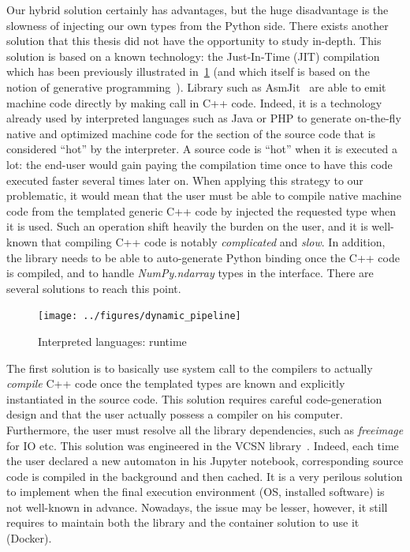 Our hybrid solution certainly has advantages, but the huge disadvantage is the slowness of injecting our own types from
the Python side. There exists another solution that this thesis did not have the opportunity to study in-depth. This
solution is based on a known technology: the Just-In-Time (JIT) compilation which has been previously illustrated
in~\cref{summary:fig:static.dynamic.dynamic.pipeline} (and which itself is based on the notion of generative
programming~\parencite{czarnecki.2000.generative}). Library such as AsmJit~\parencite{kobalicek.2011.asmjit} are able to
emit machine code directly by making call in C++ code. Indeed, it is a technology already used by interpreted languages
such as Java or PHP to generate on-the-fly native and optimized machine code for the section of the source code that is
considered ``hot'' by the interpreter. A source code is ``hot'' when it is executed a lot: the end-user would gain
paying the compilation time once to have this code executed faster several times later on. When applying this strategy
to our problematic, it would mean that the user must be able to compile native machine code from the templated generic
C++ code by injected the requested type when it is used. Such an operation shift heavily the burden on the user, and it
is well-known that compiling C++ code is notably \emph{complicated} and \emph{slow}. In addition, the library needs to
be able to auto-generate Python binding once the C++ code is compiled, and to handle \emph{NumPy.ndarray} types in the
interface. There are several solutions to reach this point.

\begin{figure}[htbp]
  \centering
  \texttt{[image: ../figures/dynamic\_pipeline]}
  \caption{Interpreted languages: runtime}
  \label{summary:fig:static.dynamic.dynamic.pipeline}
\end{figure}

The first solution is to basically use system call to the compilers to actually \emph{compile} C++ code once the
templated types are known and explicitly instantiated in the source code. This solution requires careful code-generation
design and that the user actually possess a compiler on his computer. Furthermore, the user must resolve all the library
dependencies, such as \emph{freeimage} for IO etc. This solution was engineered in the VCSN
library~\parencite{demaille.2013.vcsn}. Indeed, each time the user declared a new automaton in his Jupyter notebook,
corresponding source code is compiled in the background and then cached. It is a very perilous solution to implement
when the final execution environment (OS, installed software) is not well-known in advance. Nowadays, the issue may be
lesser, however, it still requires to maintain both the library and the container solution to use it (Docker).

